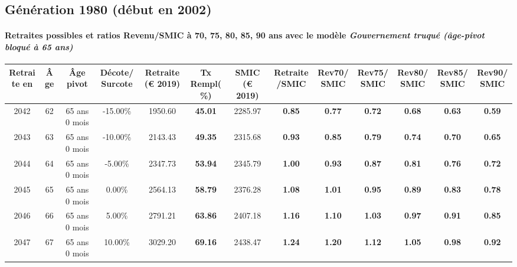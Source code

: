\newpage 
 
\subsection{Génération 1980 (début en 2002)} 

\paragraph{Retraites possibles et ratios Revenu/SMIC à 70, 75, 80, 85, 90 ans avec le modèle \emph{Gouvernement truqué (âge-pivot bloqué à 65 ans)}}  
 
{ \scriptsize \begin{center} 
\begin{tabular}[htb]{|c|c||c|c||c|c||c||c|c|c|c|c|c|} 
\hline 
 Retraite en &  Âge &  Âge pivot &  Décote/Surcote &  Retraite (\euro{} 2019) &  Tx Rempl(\%) &  SMIC (\euro{} 2019) &  Retraite/SMIC &  Rev70/SMIC &  Rev75/SMIC &  Rev80/SMIC &  Rev85/SMIC &  Rev90/SMIC \\ 
\hline \hline 
 2042 &  62 &  65 ans 0 mois &  -15.00\% &  1950.60 &  {\bf 45.01} &  2285.97 &  {\bf {\color{red} 0.85}} &  {\bf {\color{red} 0.77}} &  {\bf {\color{red} 0.72}} &  {\bf {\color{red} 0.68}} &  {\bf {\color{red} 0.63}} &  {\bf {\color{red} 0.59}} \\ 
\hline 
 2043 &  63 &  65 ans 0 mois &  -10.00\% &  2143.43 &  {\bf 49.35} &  2315.68 &  {\bf {\color{red} 0.93}} &  {\bf {\color{red} 0.85}} &  {\bf {\color{red} 0.79}} &  {\bf {\color{red} 0.74}} &  {\bf {\color{red} 0.70}} &  {\bf {\color{red} 0.65}} \\ 
\hline 
 2044 &  64 &  65 ans 0 mois &  -5.00\% &  2347.73 &  {\bf 53.94} &  2345.79 &  {\bf 1.00} &  {\bf {\color{red} 0.93}} &  {\bf {\color{red} 0.87}} &  {\bf {\color{red} 0.81}} &  {\bf {\color{red} 0.76}} &  {\bf {\color{red} 0.72}} \\ 
\hline 
 2045 &  65 &  65 ans 0 mois &  0.00\% &  2564.13 &  {\bf 58.79} &  2376.28 &  {\bf 1.08} &  {\bf 1.01} &  {\bf {\color{red} 0.95}} &  {\bf {\color{red} 0.89}} &  {\bf {\color{red} 0.83}} &  {\bf {\color{red} 0.78}} \\ 
\hline 
 2046 &  66 &  65 ans 0 mois &  5.00\% &  2791.21 &  {\bf 63.86} &  2407.18 &  {\bf 1.16} &  {\bf 1.10} &  {\bf 1.03} &  {\bf {\color{red} 0.97}} &  {\bf {\color{red} 0.91}} &  {\bf {\color{red} 0.85}} \\ 
\hline 
 2047 &  67 &  65 ans 0 mois &  10.00\% &  3029.20 &  {\bf 69.16} &  2438.47 &  {\bf 1.24} &  {\bf 1.20} &  {\bf 1.12} &  {\bf 1.05} &  {\bf {\color{red} 0.98}} &  {\bf {\color{red} 0.92}} \\ 
\hline 
\hline 
\end{tabular} 
\end{center} } 
